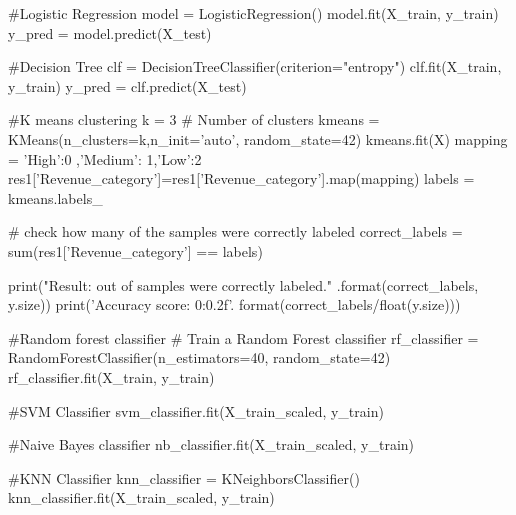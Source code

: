 \documentclass{josis}
\begin{document}
 \begin{python}
 #Logistic Regression
 model = LogisticRegression()
 model.fit(X_train, y_train)
 y_pred = model.predict(X_test)

#Decision Tree
clf = DecisionTreeClassifier(criterion="entropy")
clf.fit(X_train, y_train)
y_pred = clf.predict(X_test)

#K means clustering
k = 3 # Number of clusters
kmeans = KMeans(n_clusters=k,n_init='auto', random_state=42)
kmeans.fit(X)
mapping = {'High':0 ,'Medium': 1,'Low':2}
res1['Revenue_category']=res1['Revenue_category'].map(mapping)
labels = kmeans.labels_

# check how many of the samples were correctly labeled
correct_labels = sum(res1['Revenue_category'] ==  labels)

print("Result: {} out of {} samples were correctly labeled." .format(correct_labels, y.size))
print('Accuracy score: {0:0.2f}'. format(correct_labels/float(y.size)))

#Random forest classifier
# Train a Random Forest classifier
rf_classifier = RandomForestClassifier(n_estimators=40, random_state=42)
rf_classifier.fit(X_train, y_train)

#SVM Classifier
svm_classifier.fit(X_train_scaled, y_train)


#Naive Bayes classifier
nb_classifier.fit(X_train_scaled, y_train)


#KNN Classifier
knn_classifier = KNeighborsClassifier()
knn_classifier.fit(X_train_scaled, y_train)
\end{python}
\end{document}
